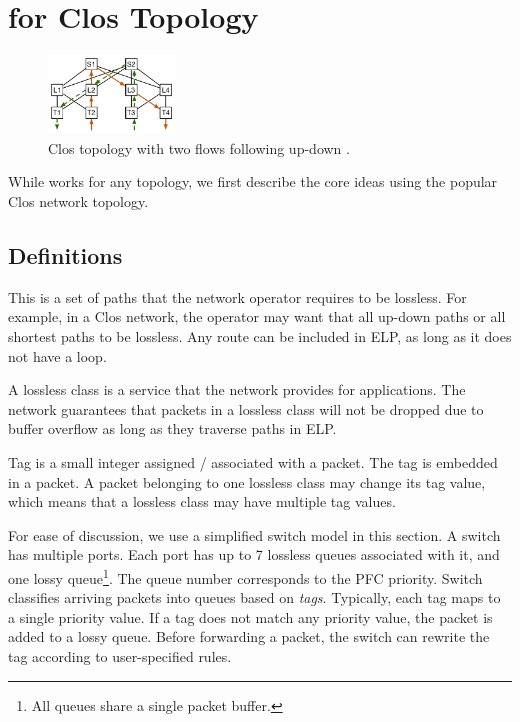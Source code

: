 \section{\sysname{} for Clos Topology}
\label{sec:specific}

\begin{figure}[t]
		\centering
		\includegraphics[width=0.3\textwidth] {figs/updown_paths}
		\caption{Clos topology with two flows following up-down .}
		\label{fig:basic_clos}
\end{figure}

While \sysname{} works for any topology, we first describe the core ideas using
the popular Clos network topology.

\subsection {Definitions}

 This is a set of paths that the network
operator requires to be lossless. For example, in a Clos network, the operator
may want that all up-down paths or all shortest paths to be lossless.  Any route
can be included in ELP, as long as it does not have a loop.

 A lossless class is a service that the network provides for
applications. The network guarantees that packets in a lossless class will not
be dropped due to buffer overflow as long as they traverse paths in ELP.

 Tag is a small integer assigned / associated with a packet. The tag
is embedded in a packet. A packet belonging to one lossless class may change its
tag value, which means that a lossless class may have multiple tag values.

 For ease of discussion, we use a simplified
switch model in this section.  A switch has multiple ports. Each port has up to 7
lossless queues associated with it, and one lossy queue\footnote{All queues
share a single packet buffer.}. The queue number corresponds to the PFC priority.
Switch classifies arriving packets into queues based on {\em tags}.  Typically,
each tag maps to a single priority value. If a tag does not match any priority
value, the packet is added to a lossy queue. Before forwarding a packet, the
switch can rewrite the tag according to user-specified rules.

